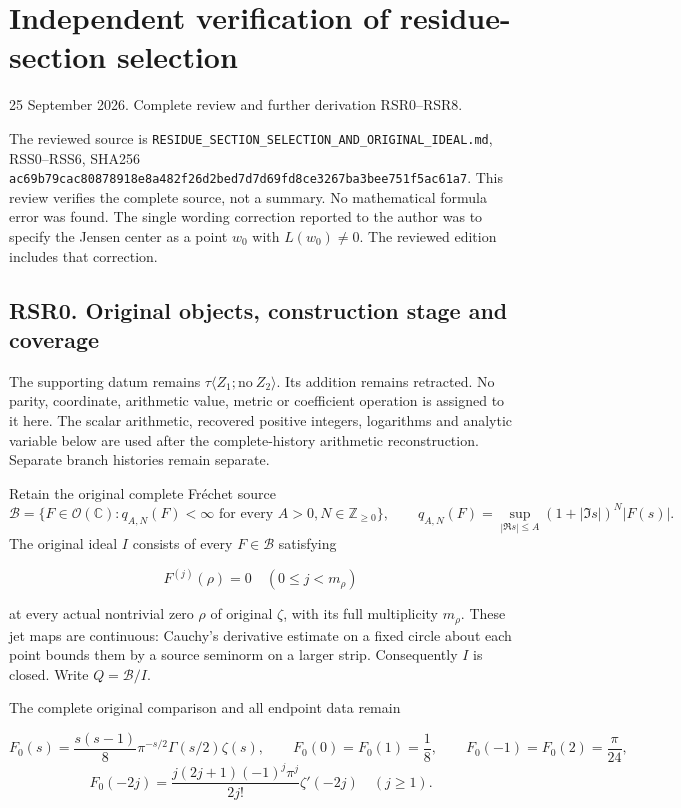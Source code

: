 \section{Independent verification of residue-section
selection}\label{independent-verification-of-residue-section-selection}

25 September 2026. Complete review and further derivation RSR0--RSR8.

The reviewed source is
\nolinkurl{RESIDUE_SECTION_SELECTION_AND_ORIGINAL_IDEAL.md}, RSS0--RSS6,
SHA256
\nolinkurl{ac69b79cac80878918e8a482f26d2bed7d7d69fd8ce3267ba3bee751f5ac61a7}.
This review verifies the complete source, not a summary. No mathematical
formula error was found. The single wording correction reported to the
author was to specify the Jensen center as a point \(w_0\) with
\(L(w_0)\ne0\). The reviewed edition includes that correction.

\subsection{RSR0. Original objects, construction stage and
coverage}\label{rsr0.-original-objects-construction-stage-and-coverage}

The supporting datum remains
\(\tau\langle Z_1;\mathrm{no}\ Z_2\rangle\). Its addition remains
retracted. No parity, coordinate, arithmetic value, metric or
coefficient operation is assigned to it here. The scalar arithmetic,
recovered positive integers, logarithms and analytic variable below are
used after the complete-history arithmetic reconstruction. Separate
branch histories remain separate.

Retain the original complete Fréchet source \[
\mathcal B=\{F\in\mathcal O(\mathbb C):q_{A,N}(F)<\infty
\text{ for every }A>0,N\in\mathbb Z_{\ge0}\},\qquad
q_{A,N}(F)=\sup_{|\Re s|\le A}(1+|\Im s|)^N|F(s)|.
\tag{RSR0.1}
\] The original ideal \(I\) consists of every \(F\in\mathcal B\)
satisfying

\[
F^{(j)}(\rho)=0\quad(0\le j<m_\rho)
\tag{RSR0.2}
\]

at every actual nontrivial zero \(\rho\) of original \(\zeta\), with its
full multiplicity \(m_\rho\). These jet maps are continuous: Cauchy's
derivative estimate on a fixed circle about each point bounds them by a
source seminorm on a larger strip. Consequently \(I\) is closed. Write
\(Q=\mathcal B/I\).

The complete original comparison and all endpoint data remain

\[
F_0(s)=\frac{s(s-1)}8\pi^{-s/2}\Gamma(s/2)\zeta(s),\qquad
F_0(0)=F_0(1)=\frac18,\qquad F_0(-1)=F_0(2)=\frac\pi{24},
\] \[
F_0(-2j)=\frac{j(2j+1)(-1)^j\pi^j}{2j!}\zeta'(-2j)
\quad(j\ge1).
\tag{RSR0.3}
\]

